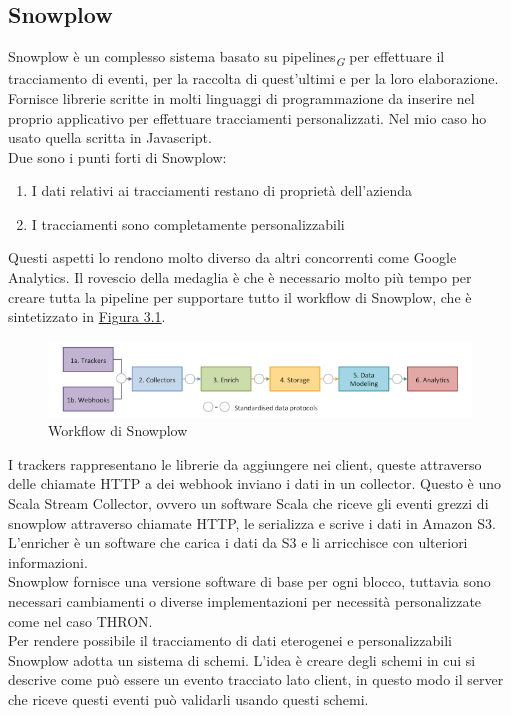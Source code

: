 \documentclass[a4paper, 12pt, twoside, openright]{book}
\newcommand{\gloss}[1]{#1\textsubscript{\textit{\tiny{G}}}}
\begin{document}
\subsection{Snowplow}
\label{snowplow}
Snowplow è un complesso sistema basato su \gloss{pipelines} per effettuare il tracciamento di eventi, per la raccolta di quest'ultimi e per la loro elaborazione.\\
Fornisce librerie scritte in molti linguaggi di programmazione da inserire nel proprio applicativo per effettuare tracciamenti personalizzati. Nel mio caso ho usato quella scritta in Javascript.\\
Due sono i punti forti di Snowplow: 
\begin{enumerate}
	\item I dati relativi ai tracciamenti restano di proprietà dell'azienda
	\item I tracciamenti sono completamente personalizzabili
\end{enumerate}
Questi aspetti lo rendono molto diverso da altri concorrenti come Google Analytics. Il rovescio della medaglia è che è necessario molto più tempo per creare tutta la pipeline per supportare tutto il workflow di Snowplow, che è sintetizzato in \hyperref[snowplow-workflow]{Figura 3.1}.
\begin{figure}[H]
	\centering
	\label{snowplow-workflow}
	\includegraphics[width=1.0\textwidth]{images/snowplow-workflow.png}
	\caption{Workflow di Snowplow}
\end{figure} 
I trackers rappresentano le librerie da aggiungere nei client, queste attraverso delle chiamate HTTP a dei webhook inviano i dati in un collector. Questo è uno Scala Stream Collector, ovvero un software Scala che riceve gli eventi grezzi di snowplow attraverso chiamate HTTP, le serializza e scrive i dati in Amazon S3. L'enricher è un software che carica i dati da S3 e li arricchisce con ulteriori informazioni.\\
Snowplow fornisce una versione software di base per ogni blocco, tuttavia sono necessari cambiamenti o diverse implementazioni per necessità personalizzate come nel caso THRON.\\
Per rendere possibile il tracciamento di dati eterogenei e personalizzabili Snowplow adotta un sistema di schemi. L'idea è creare degli schemi in cui si descrive come può essere un evento tracciato lato client, in questo modo il server che riceve questi eventi può validarli usando questi schemi.\\ 
\end{document}
